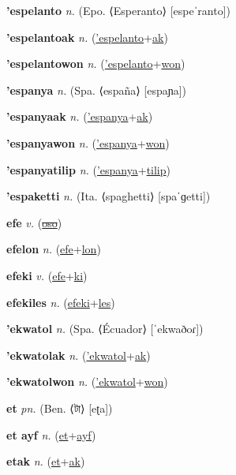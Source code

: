 \textbf{\hypertarget{'espelanto}{'espelanto}} \textit{n.} (Epo. ⟨Esperanto⟩ [espeˈranto])


\textbf{\hypertarget{'espelantoak}{'espelantoak}} \textit{n.} (\hyperlink{'espelanto}{'espelanto}+\allowbreak \hyperlink{ak}{ak})


\textbf{\hypertarget{'espelantowon}{'espelantowon}} \textit{n.} (\hyperlink{'espelanto}{'espelanto}+\allowbreak \hyperlink{won}{won})


\textbf{\hypertarget{'espanya}{'espanya}} \textit{n.} (Spa. ⟨españa⟩ [espaɲa])


\textbf{\hypertarget{'espanyaak}{'espanyaak}} \textit{n.} (\hyperlink{'espanya}{'espanya}+\allowbreak \hyperlink{ak}{ak})


\textbf{\hypertarget{'espanyawon}{'espanyawon}} \textit{n.} (\hyperlink{'espanya}{'espanya}+\allowbreak \hyperlink{won}{won})


\textbf{\hypertarget{'espanyatilip}{'espanyatilip}} \textit{n.} (\hyperlink{'espanya}{'espanya}+\allowbreak \hyperlink{tilip}{tilip})


\textbf{\hypertarget{'espaketti}{'espaketti}} \textit{n.} (Ita. ⟨spaghetti⟩ [spaˈɡetti])


\textbf{\hypertarget{efe}{efe}} \textit{v.} (\hyperlink{oso}{\sout{oso}})


\textbf{\hypertarget{efelon}{efelon}} \textit{n.} (\hyperlink{efe}{efe}+\allowbreak \hyperlink{lon}{lon})


\textbf{\hypertarget{efeki}{efeki}} \textit{v.} (\hyperlink{efe}{efe}+\allowbreak \hyperlink{ki}{ki})


\textbf{\hypertarget{efekiles}{efekiles}} \textit{n.} (\hyperlink{efeki}{efeki}+\allowbreak \hyperlink{les}{les})


\textbf{\hypertarget{'ekwatol}{'ekwatol}} \textit{n.} (Spa. ⟨Écuador⟩ [ˈekwaðoɾ])


\textbf{\hypertarget{'ekwatolak}{'ekwatolak}} \textit{n.} (\hyperlink{'ekwatol}{'ekwatol}+\allowbreak \hyperlink{ak}{ak})


\textbf{\hypertarget{'ekwatolwon}{'ekwatolwon}} \textit{n.} (\hyperlink{'ekwatol}{'ekwatol}+\allowbreak \hyperlink{won}{won})


\textbf{\hypertarget{et}{et}} \textit{pn.} (Ben. ⟨{\bengali{}টা}⟩ [eʈa])


\textbf{\hypertarget{et ayf}{et ayf}} \textit{n.} (\hyperlink{et}{et}+\allowbreak \hyperlink{ayf}{ayf})


\textbf{\hypertarget{etak}{etak}} \textit{n.} (\hyperlink{et}{et}+\allowbreak \hyperlink{ak}{ak})


